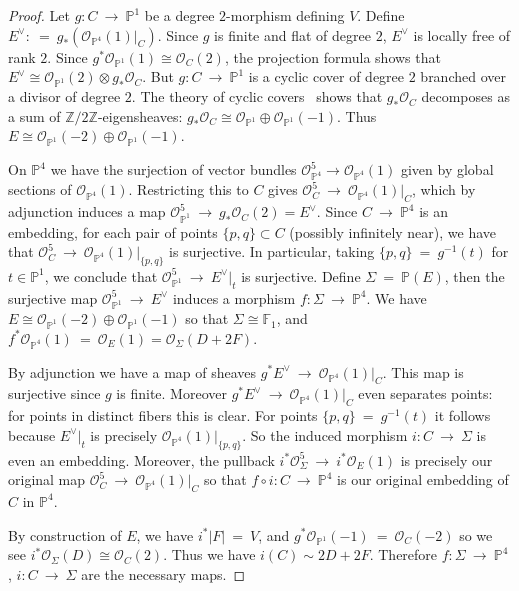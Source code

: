 \documentclass[twoside,12pt,reqno]{amsart}
\theoremstyle{plain}
\theoremstyle{definition}
\newcommand{\ZZ}{\mathbb{Z}}
\newcommand{\FF}{\mathbb{F}}
\newcommand{\PP}{\mathbb{P}}
\def\ps{\vspace{4pt}}
\newcommand{\OO}{\mathcal O}
\begin{document}
\begin{proof}
Let $g:C~\rightarrow~ \PP^1$ be a degree $2$-morphism defining $V$.
Define $E^\vee :~=~ g_* (\OO_{\PP^4}(1)|_C)$.  Since $g$ is finite and
flat of degree $2$, $E^\vee$ is locally free of rank $2$.
Since $g^{*}\OO_{\PP^1}(1)\cong \OO_{C}(2)$, the projection formula shows
that $E^\vee\cong \OO_{\PP^1}(2)\otimes g_*\OO_C$.  But
$g:C~\rightarrow~ \PP^1$ is a cyclic cover of degree $2$ branched over a 
divisor of degree $2$.  The theory of cyclic covers~\cite[definition
2.50]{KM} shows that $g_*\OO_C$ decomposes as a sum of
$\ZZ/2\ZZ$-eigensheaves: $g_*\OO_C \cong
\OO_{\PP^1} \oplus \OO_{\PP^1}(-1)$.  Thus $E\cong
\OO_{\PP^1}(-2)\oplus \OO_{\PP^1}(-1)$.  

\ps

On $\PP^4$ we have the surjection of vector bundles $\OO_{\PP^4}^5\rightarrow
\OO_{\PP^4}(1)$ given by global sections of $\OO_{\PP^4}(1)$.  Restricting
this to $C$ gives $\OO_{C}^5~\rightarrow~ \OO_{\PP^4}(1)|_C$, 
which by adjunction induces a map 
$\OO_{\PP^1}^5~\rightarrow~ g_{*}\OO_{C}(2) = E^\vee$.  
Since $C~\rightarrow~ \PP^4$ is an
embedding, for each pair of points $\{p,q\}\subset C$ (possibly
infinitely near), we have that $\OO_C^5~\rightarrow~
\OO_{\PP^4}(1)|_{\{p,q\}}$ is surjective.  In particular, taking
$\{p,q\} ~=~ g^{-1}(t)$ for $t\in\PP^1$, we conclude that
$\OO_{\PP^1}^5~\rightarrow~ E^\vee|_t$ is surjective.  Define $\Sigma ~=~
\PP(E)$, then the surjective map $\OO_{\PP^1}^5~\rightarrow~ E^\vee$
induces a morphism $f:\Sigma~\rightarrow~ \PP^4$.  We have $E\cong
\OO_{\PP^1}(-2)\oplus \OO_{\PP^1}(-1)$ so that $\Sigma \cong \FF_1$,
and $f^*\OO_{\PP^4}(1) ~=~ \OO_{E}(1) =  \OO_{\Sigma}(D+2F)$.  


\ps

By adjunction we have a map of sheaves $g^*E^\vee ~\rightarrow~
\OO_{\PP^4}(1)|_C$.  This map is surjective since $g$ is finite.
Moreover $g^* E^\vee ~\rightarrow~ \OO_{\PP^4}(1)|_C$ even separates
points: for points in distinct fibers this is clear.  For points
$\{p,q\}~=~g^{-1}(t)$ it follows because $E^{\vee}|_t$ is precisely
$\OO_{\PP^4}(1)|_{\{p,q\}}$.  So the induced morphism $i:C~\rightarrow~
\Sigma$ is even an embedding.  Moreover, the pullback
$i^*\OO_{\Sigma}^5~\rightarrow~ i^*\OO_{E}(1)$ is precisely our
original map $\OO_C^5~\rightarrow~ \OO_{\PP^4}(1)|_C$ so that $f\circ
i:C~\rightarrow~ \PP^4$ is our original embedding of $C$ in $\PP^4$.

\ps

By construction of
$E$, we have $i^*|F|~=~V$,  and $g^*\OO_{\PP^1}(-1)~=~\OO_C(-2)$ so we see 
$i^*\OO_{\Sigma}(D)\cong \OO_C(2)$.  Thus we have $i(C)\sim 2D+2F$.
Therefore $f:\Sigma~\rightarrow~ \PP^4$, $i:C~\rightarrow~ \Sigma$ are the
necessary maps.


\end{proof}
\end{document}

